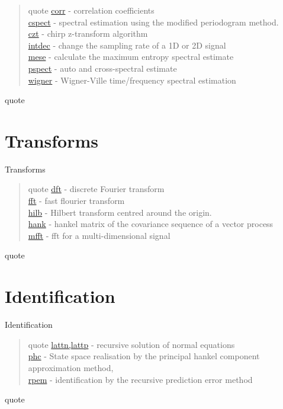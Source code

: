 \begin{quote}{quote}
\noindent
\hyperlink{corr}{corr} - correlation coefficients \\
\hyperlink{cspect}{cspect} - spectral estimation using the modified periodogram method. \\
\hyperlink{czt}{czt} - chirp z-transform algorithm \\
\hyperlink{intdec}{intdec} - change the sampling rate of a 1D or 2D signal \\
\hyperlink{mese}{mese} - calculate the maximum entropy spectral estimate \\
\hyperlink{pspect}{pspect} - auto and cross-spectral estimate \\
\hyperlink{wigner}{wigner} - Wigner-Ville time/frequency spectral estimation 
\end{quote}{quote}

\section*{Transforms}{Transforms}
\begin{quote}{quote}
\noindent
\hyperlink{dft}{dft} - discrete Fourier transform \\
\hyperlink{fft}{fft} - fast flourier transform \\
\hyperlink{hilb}{hilb} - Hilbert transform centred around the origin. \\
\hyperlink{hank}{hank} - hankel matrix of the covariance sequence of a vector process \\
\hyperlink{mfft}{mfft} - fft for a multi-dimensional signal  
\end{quote}{quote}

\section*{Identification}{Identification}
\begin{quote}{quote}
\noindent
\hyperlink{lattn,lattp}{lattn,lattp} - recursive solution of normal equations \\
\hyperlink{phc}{phc} - State space realisation by the principal hankel component  approximation method, \\
\hyperlink{rpem}{rpem} - identification by the recursive prediction error method 
\end{quote}{quote}


